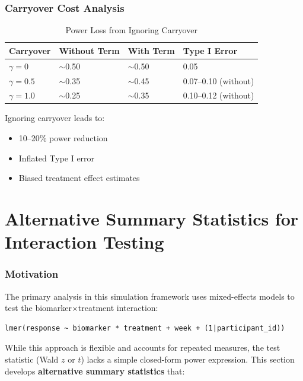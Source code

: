 \documentclass[11pt]{article}
\theoremstyle{definition}
\begin{document}
\section{Carryover Cost Analysis}

\begin{table}[h]
\centering
\caption{Power Loss from Ignoring Carryover}
\begin{tabular}{@{}llll@{}}
\toprule
\textbf{Carryover} & \textbf{Without Term} & \textbf{With Term} & \textbf{Type I Error} \\
\midrule
$\gamma = 0$ & $\sim$0.50 & $\sim$0.50 & 0.05 \\
$\gamma = 0.5$ & $\sim$0.35 & $\sim$0.45 & 0.07--0.10 (without) \\
$\gamma = 1.0$ & $\sim$0.25 & $\sim$0.35 & 0.10--0.12 (without) \\
\bottomrule
\end{tabular}
\end{table}

Ignoring carryover leads to:
\begin{itemize}
    \item 10--20\% power reduction
    \item Inflated Type I error
    \item Biased treatment effect estimates
\end{itemize}

\part{Alternative Summary Statistics for Interaction Testing}

\section{Motivation}

The primary analysis in this simulation framework uses mixed-effects models to
test the biomarker$\times$treatment interaction:
\begin{lstlisting}
lmer(response ~ biomarker * treatment + week + (1|participant_id))
\end{lstlisting}

While this approach is flexible and accounts for repeated measures, the test
statistic (Wald $z$ or $t$) lacks a simple closed-form power expression. This
section develops \textbf{alternative summary statistics} that:
\end{document}
